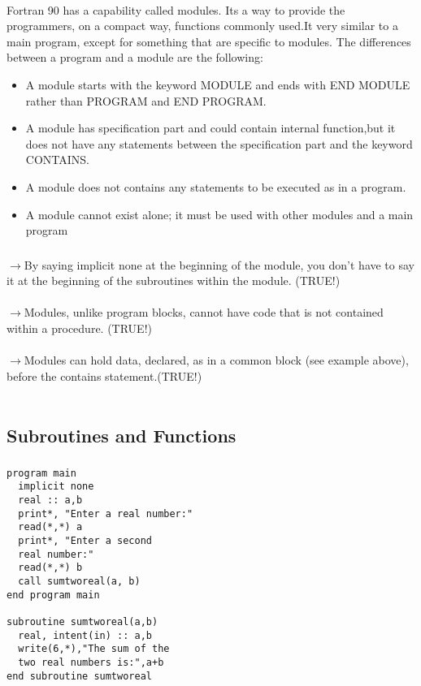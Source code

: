 \documentclass[twocolumn]{article}
\begin{document}
\paragraph*{}
 Fortran 90 has a capability called modules. Its a way to provide the programmers, on a compact way, functions commonly used.It very similar to a main program, except for something that are specific to modules.
 The differences between a program and a module are the following:
 \begin{itemize}
 \item A module starts with the keyword MODULE and ends with END MODULE rather than PROGRAM and END PROGRAM.
 \item A module has specification part and could contain internal function,but it does not have any statements between the specification part and the keyword CONTAINS.
 \item A module does not contains any statements to be executed as in a program.
 \item A module cannot exist alone; it must be used with other modules and a main program
 \end{itemize}

\subsubsection{}
\begin{itemize}%

\(\rightarrow\)By saying implicit none at the beginning of the module, you don’t have to say it
at the beginning of the subroutines within the module. (\bold TRUE!)\\
\\
\(\rightarrow\)Modules, unlike program blocks, cannot have code that is not contained within a
procedure. (\bold TRUE!)\\
\\
\(\rightarrow\)Modules can hold data, declared, as in a common block (see example above),
before the contains statement.(\bold TRUE!)\\
\\
\end{itemize}
\subsection{Subroutines and Functions}

\subsubsection{}
\begin{verbatim}
program main
  implicit none
  real :: a,b
  print*, "Enter a real number:"
  read(*,*) a
  print*, "Enter a second
  real number:"
  read(*,*) b
  call sumtworeal(a, b)
end program main

subroutine sumtworeal(a,b)
  real, intent(in) :: a,b
  write(6,*),"The sum of the 
  two real numbers is:",a+b
end subroutine sumtworeal
\end{verbatim}
\end{document}
